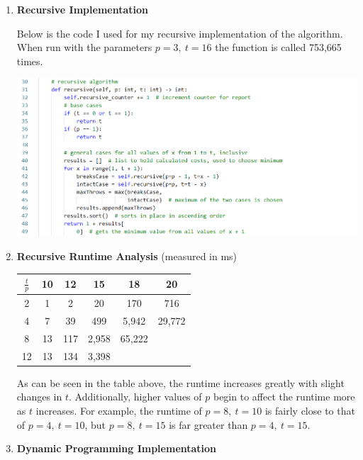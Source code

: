 \documentclass[12pt]{article}
\begin{document}
\begin{enumerate}
    \item \textbf{Recursive Implementation}
    
    Below is the code I used for my recursive implementation of the algorithm.
    When run with the parameters $p = 3,~t = 16$ the function is called 753,665 times.
    \begin{center}
        \includegraphics[width=5.5in]{recursive.png}
    \end{center}

    \item \textbf{Recursive Runtime Analysis} (measured in ms)
    
    \begin{center}
        \begin{tabular}{|c|c|c|c|c|c|}\hline
            $\frac{t}{p}$ & 10 & 12 & 15 & 18 & 20 \\\hline
            2 & 1 & 2 & 20 & 170 & 716 \\\hline
            4 & 7 & 39 & 499 & 5,942 & 29,772\\\hline
            8 & 13 & 117 & 2,958 & 65,222 & \\\hline
            12 & 13 & 134 & 3,398 & & \\\hline
        \end{tabular}
    \end{center}
    As can be seen in the table above, the runtime increases greatly with slight
    changes in $t$. Additionally, higher values of $p$ begin to affect the runtime
    more as $t$ increases. For example, the runtime of $p = 8,~t = 10$ is fairly
    close to that of $p = 4,~t = 10$, but $p = 8,~t = 15$ is far greater than
    $p = 4,~t = 15$.

    \pagebreak
    \item \textbf{Dynamic Programming Implementation}
    

\end{enumerate}
\end{document}
